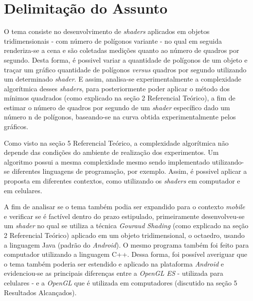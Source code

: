 \chapter[Delimitação do Assunto]{Delimitação do Assunto}

O tema consiste no desenvolvimento de \textit{shaders} aplicados em objetos tridimensionais - com número de polígonos variante - no qual em seguida renderiza-se a cena e são coletadas medições quanto ao número de quadros por segundo. Desta forma, é possivel variar a quantidade de polígonos de um objeto e traçar um gráfico quantidade de polígonos \textit{versus} quadros por segundo utilizando um determinado \textit{shader}. E assim, analisa-se experimentalmente a complexidade algorítmica desses \textit{shaders}, para posteriormente poder aplicar o método dos mínimos quadrados (como explicado na seção 2 Referencial Teórico), a fim de estimar o número de quadros por segundo de um \textit{shader} específico dado um número n de polígonos, baseando-se na curva obtida experimentalmente pelos gráficos.  

Como visto na seção 5 Referencial Teórico, a complexidade algorítmica não depende das condições do ambiente de realização dos experimentos. Um algoritmo possui a mesma complexidade mesmo sendo implementado utilizando-se diferentes linguagens de programação, por exemplo. Assim, é possivel aplicar a proposta em diferentes contextos, como utilizando os \textit{shaders} em computador e em celulares. 

A fim de analisar se o tema também podia ser expandido para o contexto \textit{mobile} e verificar se é factível dentro do prazo estipulado, primeiramente desenvolveu-se um \textit{shader} no qual se utiliza a técnica \textit{Gouraud Shading} (como explicado na seção 2 Referencial Teórico) aplicado em um objeto tridimensional, o octaedro, usando a linguagem Java (padrão do \textit{Android}). O mesmo programa também foi feito para computador utilizando a linguagem C++.  Dessa forma, foi possível averiguar que o tema também poderia ser estendido e aplicado na plataforma \textit{Android} e evidenciou-se as principais diferenças entre a \textit{OpenGL ES} - utilizada para celulares - e a \textit{OpenGL} que é utilizada em computadores (discutido na seção 5 Resultados Alcançados). 
